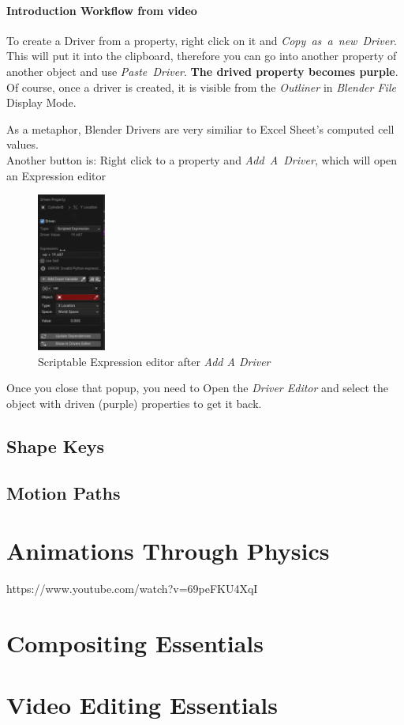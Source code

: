 \documentclass{article}
\begin{document}
\paragraph{Introduction Workflow from video}
To create a Driver from a property, right click on it and \mbox{\textit{Copy as a new Driver}}. This will put it into the clipboard, therefore you can go into another property of another object and 
use \mbox{\textit{Paste Driver}}. \textbf{The drived property becomes purple}.\\
Of course, once a driver is created, it is visible from the \textit{Outliner} in \textit{Blender File} Display Mode.\par
As a metaphor, Blender Drivers are very similiar to Excel Sheet's computed cell values.\\
Another button is: Right click to a property and \mbox{\textit{Add A Driver}}, which will open an Expression editor
\begin{figure}
    \includegraphics[width=0.2\textwidth]{blender_docs_images/my_driver_scriptable_expression.png}
    \caption{Scriptable Expression editor after \textit{Add A Driver}}
\end{figure}
Once you close that popup, you need to Open the \textit{Driver Editor} and select the object with driven (purple) properties to get it back.

\subsection{Shape Keys}\label{shapekeys}

\subsection{Motion Paths}

\section{Animations Through Physics}
https://www.youtube.com/watch?v=69peFKU4XqI

\section{Compositing Essentials}

\section{Video Editing Essentials}
\end{document}
